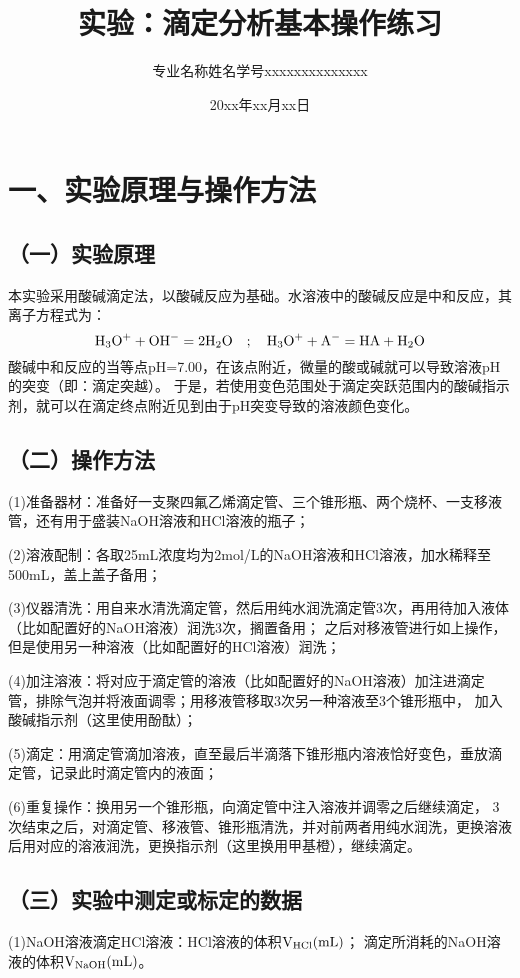 \documentclass[a4paper,12pt]{article}
\title{\heiti\zihao{2} 实验：滴定分析基本操作练习}
\author{专业名称\quad 姓\;名\quad 学号xxxxxxxxxxxxxx}
\date{20xx年xx月xx日}
\begin{document}
\maketitle

\setcounter{section}{0}
\section*{一、实验原理与操作方法}
\subsection*{（一）实验原理}
本实验采用酸碱滴定法，以酸碱反应为基础。水溶液中的酸碱反应是中和反应，其离子方程式为：
$$
\rm
H_{3}O^++OH^-=2H_2O
\quad ; \quad
H_{3}O^++A^-=HA+H_2O
$$
酸碱中和反应的当等点pH=7.00，在该点附近，微量的酸或碱就可以导致溶液pH的突变（即：滴定突越）。
于是，若使用变色范围处于滴定突跃范围内的酸碱指示剂，就可以在滴定终点附近见到由于pH突变导致的溶液颜色变化。

\subsection*{（二）操作方法}
(1)准备器材：准备好一支聚四氟乙烯滴定管、三个锥形瓶、两个烧杯、一支移液管，还有用于盛装NaOH溶液和HCl溶液的瓶子；

(2)溶液配制：各取25mL浓度均为2mol/L的NaOH溶液和HCl溶液，加水稀释至500mL，盖上盖子备用；

(3)仪器清洗：用自来水清洗滴定管，然后用纯水润洗滴定管3次，再用待加入液体（比如配置好的NaOH溶液）润洗3次，搁置备用；
之后对移液管进行如上操作，但是使用另一种溶液（比如配置好的HCl溶液）润洗；

(4)加注溶液：将对应于滴定管的溶液（比如配置好的NaOH溶液）加注进滴定管，排除气泡并将液面调零；用移液管移取3次另一种溶液至3个锥形瓶中，
加入酸碱指示剂（这里使用酚酞）；

(5)滴定：用滴定管滴加溶液，直至最后半滴落下锥形瓶内溶液恰好变色，垂放滴定管，记录此时滴定管内的液面；

(6)重复操作：换用另一个锥形瓶，向滴定管中注入溶液并调零之后继续滴定，
3次结束之后，对滴定管、移液管、锥形瓶清洗，并对前两者用纯水润洗，更换溶液后用对应的溶液润洗，更换指示剂（这里换用甲基橙），继续滴定。

\subsection*{（三）实验中测定或标定的数据}
(1)NaOH溶液滴定HCl溶液：HCl溶液的体积${\rm V_{HCl}(mL)}$；
滴定所消耗的NaOH溶液的体积${\rm V_{NaOH}(mL)}$。
\end{document}
